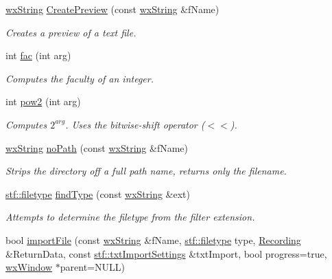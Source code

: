 \begin{DoxyCompactItemize}
\hyperlink{classwxString}{wxString} \hyperlink{group__stfgen_ga32ad0c8e262d2985d84451d3f2c52028}{CreatePreview} (const \hyperlink{classwxString}{wxString} \&fName)
\begin{DoxyCompactList}\small\item\em Creates a preview of a text file. \item\end{DoxyCompactList}\item 
int \hyperlink{group__stfgen_gaf31edaa97d0a41cd830c9478e04fd375}{fac} (int arg)
\begin{DoxyCompactList}\small\item\em Computes the faculty of an integer. \item\end{DoxyCompactList}\item 
int \hyperlink{group__stfgen_gac8474c28c6c1e5cce375823a1d38591d}{pow2} (int arg)
\begin{DoxyCompactList}\small\item\em Computes $ 2^{arg} $. Uses the bitwise-\/shift operator ($<$$<$). \item\end{DoxyCompactList}\item 
\hyperlink{classwxString}{wxString} \hyperlink{group__stfgen_gad14c86e14d611fd5c11eca4edfbb4fb8}{noPath} (const \hyperlink{classwxString}{wxString} \&fName)
\begin{DoxyCompactList}\small\item\em Strips the directory off a full path name, returns only the filename. \item\end{DoxyCompactList}\item 
\hyperlink{group__stfgen_gae703f7802498ae301ac058b94426900f}{stf::filetype} \hyperlink{group__stfgen_ga60f83eec1f06c30440d1f576bd5a5f7e}{findType} (const \hyperlink{classwxString}{wxString} \&ext)
\begin{DoxyCompactList}\small\item\em Attempts to determine the filetype from the filter extension. \item\end{DoxyCompactList}\item 
bool \hyperlink{group__stfgen_ga3c37983f5e22f103c26a77b09d8206ad}{importFile} (const \hyperlink{classwxString}{wxString} \&fName, \hyperlink{group__stfgen_gae703f7802498ae301ac058b94426900f}{stf::filetype} type, \hyperlink{classRecording}{Recording} \&ReturnData, const \hyperlink{structstf_1_1txtImportSettings}{stf::txtImportSettings} \&txtImport, bool progress=true, \hyperlink{classwxWindow}{wxWindow} $\ast$parent=NULL)

\end{DoxyCompactItemize}
